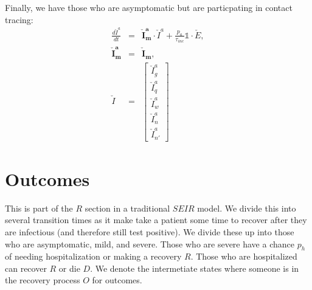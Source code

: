 \documentclass[notitlepage, superscriptaddress]{revtex4-2}
\begin{document}
Finally, we have those who are asymptomatic but are particpating in contact tracing:
\begin{eqnarray}
\frac{d\check{I}^{a}}{dt} &=& \boldsymbol{\check{I}^{a}_{m}} \cdot \check{I}^{a} +\frac{p_{a}}{\tau_{inc}} \mathbb{1} \cdot  \check{E}, \\
\boldsymbol{\check{I}^{a}_{m}} &=& \boldsymbol{\check{I}_{m}}, \\ 
\check{I} &=& 
\begin{bmatrix}
\check{I}^{a}_{g} \\ \check{I}^{a}_{q} \\ \check{I}^{a}_{w}\\ \check{I}^{a}_{n} \\ \check{I}^{a}_{n'}
\end{bmatrix}
\end{eqnarray}


\section{Outcomes}
This is part of the $R$ section in a traditional $SEIR$ model. We divide this into several transition times as it make take a patient some time to recover after they are infectious (and therefore still test positive). We divide these up into those who are asymptomatic, mild, and severe. Those who are severe have a chance $p_h$ of needing hospitalization or making a recovery $R$. Those who are hospitalized can recover $R$ or die $D$. We denote the intermetiate states where someone is in the recovery process $O$ for outcomes.
\end{document}
